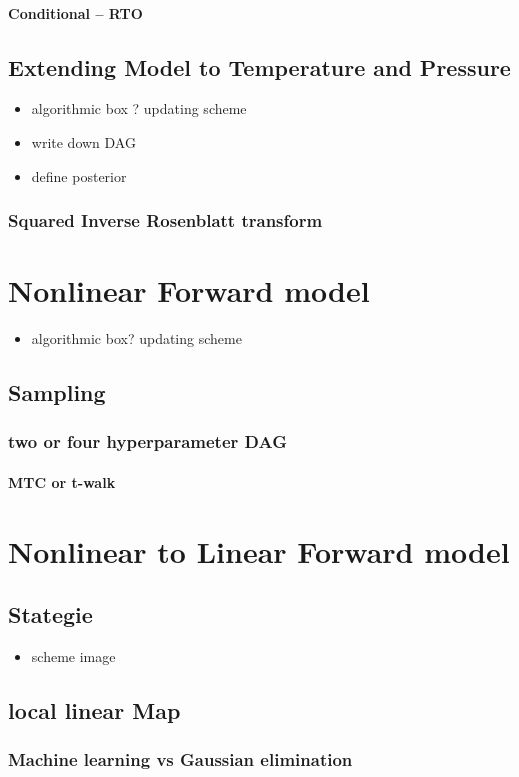\subsubsection{Conditional -- RTO}

\section{Extending Model to Temperature and Pressure}
\begin{itemize}
	\item algorithmic box ? updating scheme
	\item write down DAG
	\item define posterior
\end{itemize}

\subsection{Squared Inverse Rosenblatt transform}


\chapter{Nonlinear Forward model}
\begin{itemize}
	\item algorithmic box? updating scheme
\end{itemize}
\section{Sampling}
\subsection{two or four hyperparameter DAG}
\subsubsection{MTC or t-walk}

\chapter{Nonlinear to Linear Forward model}

\section{Stategie}
\begin{itemize}
	\item scheme image
\end{itemize}

\section{local linear Map}
\subsection{Machine learning vs Gaussian elimination}